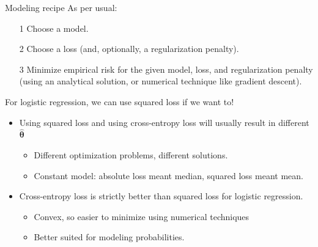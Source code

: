 \documentclass[aspectratio=169]{../latex_main/tntbeamer}  %
\begin{document}
	
	\begin{frame}[c]{Modeling recipe}
	    As per usual:
	    \begin{itemize}
	        \item[1]  Choose a model.
	        \item[2] Choose a loss (and, optionally, a regularization penalty).
	        \item[3] Minimize empirical risk for the given model, loss, and regularization penalty (using an analytical solution, or numerical technique like gradient descent).
	    \end{itemize}
	    For logistic regression, we can use squared loss if we want to!
	    \begin{itemize}
	        \item Using squared loss and using cross-entropy loss will usually result in different  $\hat{\bm{\theta}}$
	        \begin{itemize}
	            \item Different optimization problems, different solutions.
	            \item  Constant model: absolute loss meant median, squared loss meant mean.
	        \end{itemize}
	        \item Cross-entropy loss is strictly better than squared loss for logistic regression.
	        \begin{itemize}
	            \item Convex, so easier to minimize using numerical techniques
	            \item Better suited for modeling probabilities.
	        \end{itemize}
	    \end{itemize}
	\end{frame}
\end{document}
